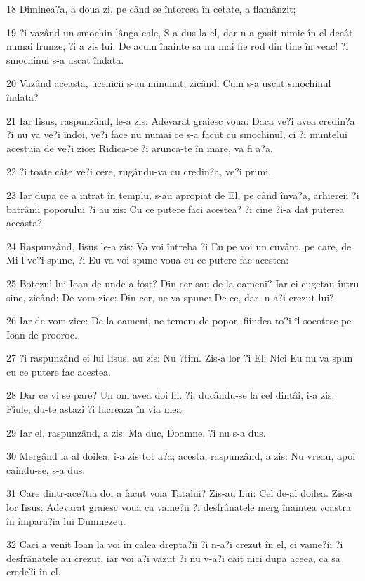 \par 18 Diminea?a, a doua zi, pe când se întorcea în cetate, a flamânzit;
\par 19 ?i vazând un smochin lânga cale, S-a dus la el, dar n-a gasit nimic în el decât numai frunze, ?i a zis lui: De acum înainte sa nu mai fie rod din tine în veac! ?i smochinul s-a uscat îndata.
\par 20 Vazând aceasta, ucenicii s-au minunat, zicând: Cum s-a uscat smochinul îndata?
\par 21 Iar Iisus, raspunzând, le-a zis: Adevarat graiesc voua: Daca ve?i avea credin?a ?i nu va ve?i îndoi, ve?i face nu numai ce s-a facut cu smochinul, ci ?i muntelui acestuia de ve?i zice: Ridica-te ?i arunca-te în mare, va fi a?a.
\par 22 ?i toate câte ve?i cere, rugându-va cu credin?a, ve?i primi.
\par 23 Iar dupa ce a intrat în templu, s-au apropiat de El, pe când înva?a, arhiereii ?i batrânii poporului ?i au zis: Cu ce putere faci acestea? ?i cine ?i-a dat puterea aceasta?
\par 24 Raspunzând, Iisus le-a zis: Va voi întreba ?i Eu pe voi un cuvânt, pe care, de Mi-l ve?i spune, ?i Eu va voi spune voua cu ce putere fac acestea:
\par 25 Botezul lui Ioan de unde a fost? Din cer sau de la oameni? Iar ei cugetau întru sine, zicând: De vom zice: Din cer, ne va spune: De ce, dar, n-a?i crezut lui?
\par 26 Iar de vom zice: De la oameni, ne temem de popor, fiindca to?i îl socotesc pe Ioan de prooroc.
\par 27 ?i raspunzând ei lui Iisus, au zis: Nu ?tim. Zis-a lor ?i El: Nici Eu nu va spun cu ce putere fac acestea.
\par 28 Dar ce vi se pare? Un om avea doi fii. ?i, ducându-se la cel dintâi, i-a zis: Fiule, du-te astazi ?i lucreaza în via mea.
\par 29 Iar el, raspunzând, a zis: Ma duc, Doamne, ?i nu s-a dus.
\par 30 Mergând la al doilea, i-a zis tot a?a; acesta, raspunzând, a zis: Nu vreau, apoi caindu-se, s-a dus.
\par 31 Care dintr-ace?tia doi a facut voia Tatalui? Zis-au Lui: Cel de-al doilea. Zis-a lor Iisus: Adevarat graiesc voua ca vame?ii ?i desfrânatele merg înaintea voastra în împara?ia lui Dumnezeu.
\par 32 Caci a venit Ioan la voi în calea drepta?ii ?i n-a?i crezut în el, ci vame?ii ?i desfrânatele au crezut, iar voi a?i vazut ?i nu v-a?i cait nici dupa aceea, ca sa crede?i în el.
